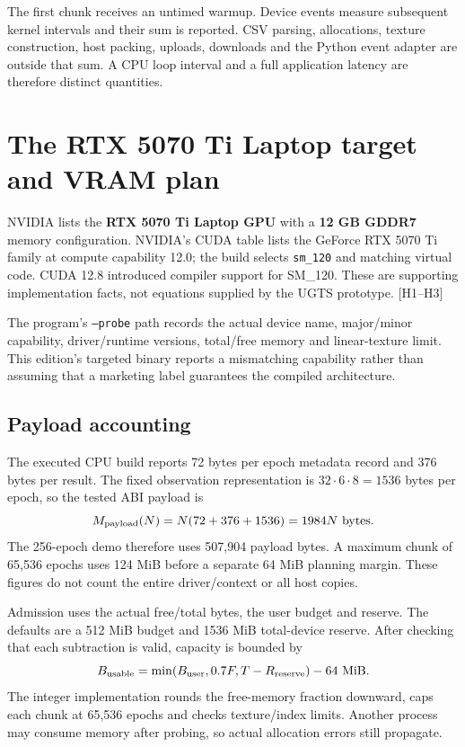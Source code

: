\documentclass[11pt,a4paper]{article}
\newcommand{\code}[1]{\texttt{#1}}
\newcommand{\ext}[1]{\textcolor{muted}{[#1]}}
\begin{document}
The first chunk receives an untimed warmup. Device events measure subsequent kernel
intervals and their sum is reported. CSV parsing, allocations, texture construction,
host packing, uploads, downloads and the Python event adapter are outside that sum.
A CPU loop interval and a full application latency are therefore distinct quantities.
\clearpage
\section{The RTX 5070 Ti Laptop target and VRAM plan}
NVIDIA lists the \textbf{RTX 5070 Ti Laptop GPU} with a \textbf{12 GB GDDR7} memory
configuration. NVIDIA's CUDA table lists the GeForce RTX 5070 Ti family at compute
capability 12.0; the build selects \code{sm\_120} and matching virtual code.
CUDA 12.8 introduced compiler support for SM\_120. These are supporting implementation
facts, not equations supplied by the UGTS prototype. \ext{H1--H3}

The program's \code{--probe} path records the actual device name, major/minor
capability, driver/runtime versions, total/free memory and linear-texture limit.
This edition's targeted binary reports a mismatching capability rather than assuming
that a marketing label guarantees the compiled architecture.

\subsection{Payload accounting}
The executed CPU build reports 72 bytes per epoch metadata record and 376 bytes per
result. The fixed observation representation is $32\cdot6\cdot8=1536$ bytes per epoch,
so the tested ABI payload is
\begin{equation}
M_{\rm payload}(N)=N(72+376+1536)=1984N\ \text{bytes}.
\end{equation}
The 256-epoch demo therefore uses 507,904 payload bytes. A maximum chunk of 65,536
epochs uses 124 MiB before a separate 64 MiB planning margin. These figures do not
count the entire driver/context or all host copies.

Admission uses the actual free/total bytes, the user budget and reserve. The defaults
are a 512 MiB budget and 1536 MiB total-device reserve. After checking that each
subtraction is valid, capacity is bounded by
\begin{equation}
B_{\rm usable}=\min(B_{\rm user},0.7F,T-R_{\rm reserve})-64\ \mathrm{MiB}.
\end{equation}
The integer implementation rounds the free-memory fraction downward, caps each chunk
at 65,536 epochs and checks texture/index limits. Another process may consume memory
after probing, so actual allocation errors still propagate.
\end{document}
